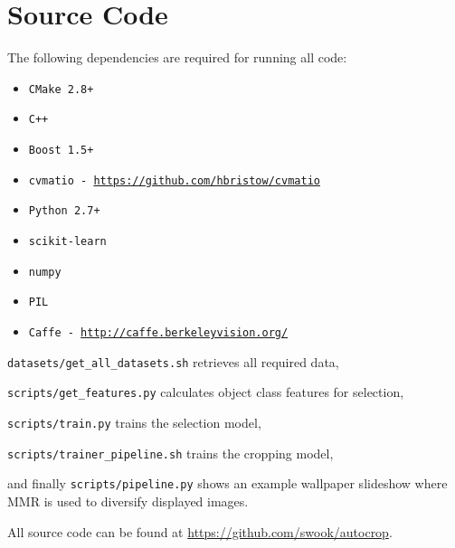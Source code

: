 %
\chapter{Source Code}

The following dependencies are required for running all code:
\begin{itemize}
\item \texttt{CMake 2.8+}
\item \texttt{C++}
\item \texttt{Boost 1.5+}
\item \texttt{cvmatio - \url{https://github.com/hbristow/cvmatio}}
\item \texttt{Python 2.7+}
\item \texttt{scikit-learn}
\item \texttt{numpy}
\item \texttt{PIL}
\item \texttt{Caffe - \url{http://caffe.berkeleyvision.org/}}
\end{itemize}

\noindent
\texttt{datasets/get\_all\_datasets.sh} retrieves all required data,

\noindent
\texttt{scripts/get\_features.py} calculates object class features for selection,

\noindent
\texttt{scripts/train.py} trains the selection model,

\noindent
\texttt{scripts/trainer\_pipeline.sh} trains the cropping model,

\noindent
and finally \texttt{scripts/pipeline.py} shows an example wallpaper slideshow
where MMR is used to diversify displayed images.

\vskip15pt

\noindent
All source code can be found at \url{https://github.com/swook/autocrop}.

